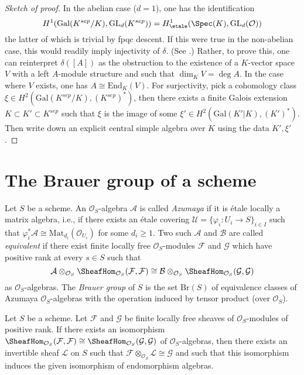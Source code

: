 \begin{proof}[Sketch of proof]
In the abelian case ($d = 1$), one has the identification
$$
H^1(\text{Gal}(K^{sep}/K), \text{GL}_d(K^{sep})) =
H_\etale^1(\Spec(K), \text{GL}_d(\mathcal{O}))
$$
the latter of which is trivial by fpqc descent. If this were true in the
non-abelian case, this would readily imply injectivity of $\delta$. (See
\cite{SGA4.5}.) Rather, to prove this, one can reinterpret $\delta([A])$ as the
obstruction to the existence of a $K$-vector space $V$ with a left $A$-module
structure and such that $\dim_K V = \deg A$. In the case where $V$ exists, one
has $A \cong \text{End}_K(V)$. For surjectivity, pick a
cohomology class $\xi \in H^2(\text{Gal}(K^{sep}/K), (K^{sep})^*)$,
then there exists a finite Galois extension $K \subset K' \subset K^{sep}$
such that $\xi$ is the image of some
$\xi' \in H^2(\text{Gal}(K'|K), (K')^*)$. Then write
down an explicit central simple algebra over $K$ using the data $K', \xi'$.
\end{proof}










\section{The Brauer group of a scheme}
\label{section-brauer-scheme}

\noindent
Let $S$ be a scheme. An $\mathcal{O}_S$-algebra
$\mathcal{A}$ is called {\it Azumaya} if it is \'etale locally a matrix
algebra, i.e., if there exists an \'etale covering
$\mathcal{U} = \{ \varphi_i : U_i \to S\}_{i \in I}$ such that
$\varphi_i^*\mathcal{A} \cong \text{Mat}_{d_i}(\mathcal{O}_{U_i})$
for some $d_i \geq 1$. Two such
$\mathcal{A}$ and $\mathcal{B}$ are called {\it equivalent} if there exist
finite locally free $\mathcal{O}_S$-modules $\mathcal{F}$ and $\mathcal{G}$
which have positive rank at every $s \in S$ such that
$$
\mathcal{A} \otimes_{\mathcal{O}_S}
\SheafHom_{\mathcal{O}_S}(\mathcal{F}, \mathcal{F})
\cong
\mathcal{B} \otimes_{\mathcal{O}_S}
\SheafHom_{\mathcal{O}_S}(\mathcal{G}, \mathcal{G})
$$
as $\mathcal{O}_S$-algebras. The {\it Brauer group} of
$S$ is the set $\text{Br}(S)$ of equivalence classes of Azumaya
$\mathcal{O}_S$-algebras with the operation induced by tensor product (over
$\mathcal{O}_S$).

\begin{lemma}
\label{lemma-end-unique-up-to-invertible}
Let $S$ be a scheme. Let $\mathcal{F}$ and $\mathcal{G}$ be finite locally
free sheaves of $\mathcal{O}_S$-modules of positive rank. If there
exists an isomorphism
$\SheafHom_{\mathcal{O}_S}(\mathcal{F}, \mathcal{F}) \cong
\SheafHom_{\mathcal{O}_S}(\mathcal{G}, \mathcal{G})$ of
$\mathcal{O}_S$-algebras, then there exists an invertible sheaf
$\mathcal{L}$ on $S$ such that
$\mathcal{F} \otimes_{\mathcal{O}_S} \mathcal{L} \cong \mathcal{G}$
and such that this isomorphism induces the given isomorphism of
endomorphism algebras.
\end{lemma}

